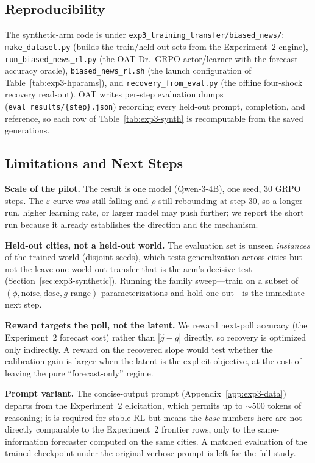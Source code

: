 \documentclass{article} %
\begin{document}
\subsection{Reproducibility}
\label{app:exp3-repro}

The synthetic-arm code is under \texttt{exp3\_training\_transfer/biased\_news/}: \texttt{make\_dataset.py}
(builds the train/held-out sets from the Experiment~2 engine), \texttt{run\_biased\_news\_rl.py}
(the OAT Dr.\ GRPO actor/learner with the forecast-accuracy oracle), \texttt{biased\_news\_rl.sh}
(the launch configuration of Table~\ref{tab:exp3-hparams}), and \texttt{recovery\_from\_eval.py} (the
offline four-shock recovery read-out).  OAT writes per-step evaluation dumps
(\texttt{eval\_results/\{step\}.json}) recording every held-out prompt, completion, and reference, so
each row of Table~\ref{tab:exp3-synth} is recomputable from the saved generations.

\subsection{Limitations and Next Steps}
\label{app:exp3-limitations}

\textbf{Scale of the pilot.}  The result is one model (Qwen-3-4B), one seed, $30$ GRPO steps.  The
$\varepsilon$ curve was still falling and $\rho$ still rebounding at step $30$, so a longer run,
higher learning rate, or larger model may push further; we report the short run because it already
establishes the direction and the mechanism.

\textbf{Held-out cities, not a held-out world.}  The evaluation set is unseen \emph{instances} of the
trained world (disjoint seeds), which tests generalization across cities but not the
leave-one-world-out transfer that is the arm's decisive test (Section~\ref{sec:exp3-synthetic}).
Running the family sweep---train on a subset of $(\phi,\text{noise},\text{dose},g\text{-range})$
parameterizations and hold one out---is the immediate next step.

\textbf{Reward targets the poll, not the latent.}  We reward next-poll accuracy (the Experiment~2
forecast cost) rather than $|\hat g-g|$ directly, so recovery is optimized only indirectly.  A reward
on the recovered slope would test whether the calibration gain is larger when the latent is the
explicit objective, at the cost of leaving the pure ``forecast-only'' regime.

\textbf{Prompt variant.}  The concise-output prompt (Appendix~\ref{app:exp3-data}) departs from the
Experiment~2 elicitation, which permits up to $\sim500$ tokens of reasoning; it is required for
stable RL but means the \emph{base} numbers here are not directly comparable to the Experiment~2
frontier rows, only to the same-information forecaster computed on the same cities.  A matched
evaluation of the trained checkpoint under the original verbose prompt is left for the full study.
\end{document}
